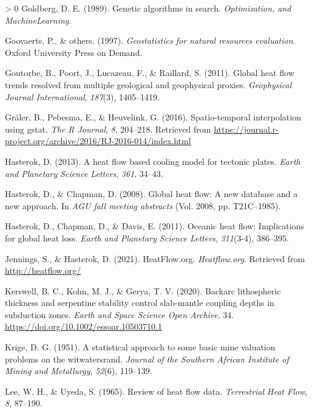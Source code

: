 \documentclass[draft,linenumbers]{agujournal2018}
\newlength{\cslhangindent}
\newenvironment{CSLReferences}[3] %
 {%
  \setlength{\parindent}{0pt}
  \ifodd #1 \everypar{\setlength{\hangindent}{\cslhangindent}}\ignorespaces\fi
  \ifnum #2 > 0
  \setlength{\parskip}{#2\baselineskip}
  \fi
 }%
 {}
\begin{document}
\begin{CSLReferences}{1}{0}
\leavevmode\hypertarget{ref-goldberg1989}{}%
Goldberg, D. E. (1989). Genetic algorithms in search.
\emph{Optimization, and MachineLearning}.

\leavevmode\hypertarget{ref-goovaerts1997}{}%
Goovaerts, P., \& others. (1997). \emph{Geostatistics for natural
resources evaluation}. Oxford University Press on Demand.

\leavevmode\hypertarget{ref-goutorbe2011}{}%
Goutorbe, B., Poort, J., Lucazeau, F., \& Raillard, S. (2011). Global
heat flow trends resolved from multiple geological and geophysical
proxies. \emph{Geophysical Journal International}, \emph{187}(3),
1405--1419.

\leavevmode\hypertarget{ref-graler2016}{}%
Gräler, B., Pebesma, E., \& Heuvelink, G. (2016). Spatio-temporal
interpolation using gstat. \emph{The R Journal}, \emph{8}, 204--218.
Retrieved from
\url{https://journal.r-project.org/archive/2016/RJ-2016-014/index.html}

\leavevmode\hypertarget{ref-hasterok2013}{}%
Hasterok, D. (2013). A heat flow based cooling model for tectonic
plates. \emph{Earth and Planetary Science Letters}, \emph{361}, 34--43.

\leavevmode\hypertarget{ref-hasterok2008}{}%
Hasterok, D., \& Chapman, D. (2008). Global heat flow: A new database
and a new approach. In \emph{AGU fall meeting abstracts} (Vol. 2008, pp.
T21C--1985).

\leavevmode\hypertarget{ref-hasterok2011}{}%
Hasterok, D., Chapman, D., \& Davis, E. (2011). Oceanic heat flow:
Implications for global heat loss. \emph{Earth and Planetary Science
Letters}, \emph{311}(3-4), 386--395.

\leavevmode\hypertarget{ref-jennings2021}{}%
Jennings, S., \& Hasterok, D. (2021). HeatFlow.org. \emph{Heatflow.org}.
Retrieved from \url{http://heatflow.org/}

\leavevmode\hypertarget{ref-kerswell2020}{}%
Kerswell, B. C., Kohn, M. J., \& Gerya, T. V. (2020). Backarc
lithospheric thickness and serpentine stability control slab-mantle
coupling depths in subduction zones. \emph{Earth and Space Science Open
Archive}, 34. \url{https://doi.org/10.1002/essoar.10503710.1}

\leavevmode\hypertarget{ref-krige1951}{}%
Krige, D. G. (1951). A statistical approach to some basic mine valuation
problems on the witwatersrand. \emph{Journal of the Southern African
Institute of Mining and Metallurgy}, \emph{52}(6), 119--139.

\leavevmode\hypertarget{ref-lee1965}{}%
Lee, W. H., \& Uyeda, S. (1965). Review of heat flow data.
\emph{Terrestrial Heat Flow}, \emph{8}, 87--190.


\end{CSLReferences}
\end{document}
